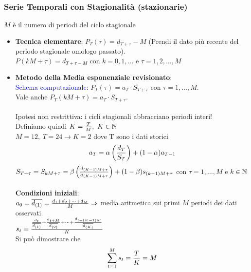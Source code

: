 \documentclass[12pt,a4paper]{article}
\begin{document}
\subsubsection{Serie Temporali con Stagionalità (stazionarie)}
$M$ è il numero di periodi del ciclo stagionale
\begin{itemize}
\item \textbf{Tecnica elementare}: $P_T(\tau) = d_{T+\tau} - M$ (Prendi il dato più recente del periodo stagionale omologo passato).\\
$P(kM+\tau) = d_{T+\tau-M}$ con $k=0,1, \dots$ e $\tau=1,2, \dots, M$
\item \textbf{Metodo della Media esponenziale revisionato}:\\
\textcolor{blue}{Schema computazionale}: $P_T(\tau) = a_T \cdot S_{T+\tau}$ con $\tau = 1, \dots, M$.\\
Vale anche $P_T(kM+\tau)= a_T \cdot S_{T+\tau}$.\\
\\
Ipotesi non restrittiva: i cicli stagionali abbracciano periodi interi!\\
Definiamo quindi $K={T\over M}, \ K \in \mathbb{N}$\\
$M=12,\ T = 24 \rightarrow K=2$ dove T sono i dati storici\\
$$a_T = \alpha \left({d_T \over S_T}\right) + (1-\alpha)a_{T-1}$$
$S_{T+\tau} = S_{kM+\tau} = \beta \left({d_{(K-1)M+\tau} \over a_{(K-1)M+\tau}}\right) + (1-\beta)s_{(k-1)M + \tau}$ con $\tau=1,\dots,M$ e $ k \in \mathbb{N}$\\
\\
\textbf{Condizioni iniziali}:\\
$a_0 = \overline{d_{(1)}} = {d_1 + d_2 + \dots + d_M \over M} \Rightarrow $ media aritmetica sui primi $M$ periodi dei dati osservati.\\
$s_t = {{d_t \over \overline{d_{(1)}}} + {d_{t+M} \over \overline{d_{(2)}}} + \dots + {d_{t+(K-1)M} \over \overline{d_{(K)}}} \over K}$\\
Si può dimostrare che $$\sum_{t=1}^M s_t = {T \over K} = M$$


\end{itemize}
\end{document}
